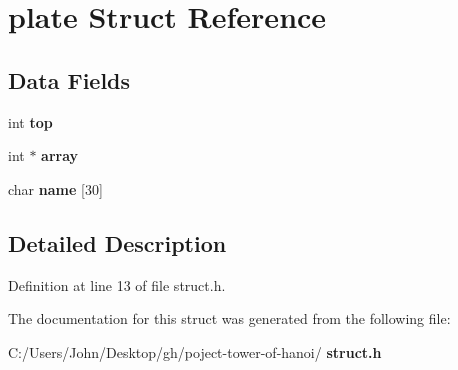 \section{plate Struct Reference}
\label{structplate}
\subsection*{Data Fields}
\begin{DoxyCompactItemize}
\item 
\mbox{\label{structplate_af93f4f37fc2ad9c37af4a715423b110c}} 
int {\bfseries top}
\item 
\mbox{\label{structplate_a0483d856b36b358ff3b62e6a3c6f95f1}} 
int $\ast$ {\bfseries array}
\item 
\mbox{\label{structplate_a72b952e44981373d9737a72616bb317f}} 
char {\bfseries name} [30]
\end{DoxyCompactItemize}


\subsection{Detailed Description}


Definition at line 13 of file struct.\+h.



The documentation for this struct was generated from the following file\+:\begin{DoxyCompactItemize}
\item 
C\+:/\+Users/\+John/\+Desktop/gh/poject-\/tower-\/of-\/hanoi/\textbf{ struct.\+h}\end{DoxyCompactItemize}
